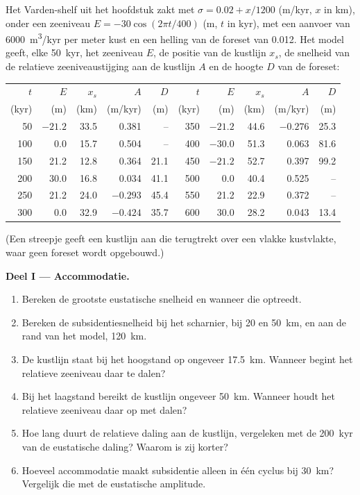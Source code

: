 \begin{problem}
\label{pb:b3:sequence-stratigraphy:1}
Het Varden-shelf uit het hoofdstuk zakt met $\sigma = 0.02 + x/1200$
(\unit{m/kyr}, $x$ in km), onder een zeeniveau $E = -30\cos(2\pi t/400)$ (m,
$t$ in kyr), met een aanvoer van \qty{6000}{m^3/kyr} per meter kust en een
helling van de foreset van 0.012. Het model geeft, elke \qty{50}{kyr}, het zeeniveau
$E$, de positie van de kustlijn $x_s$, de snelheid van de relatieve zeeniveaustijging aan de
kustlijn $A$ en de hoogte $D$ van de foreset:

\begin{center}\small
\begin{tabular}{rrrrr|rrrrr}
$t$ & $E$ & $x_s$ & $A$ & $D$ & $t$ & $E$ & $x_s$ & $A$ & $D$\\
(kyr) & (m) & (km) & (m/kyr) & (m) & (kyr) & (m) & (km) & (m/kyr) & (m)\\\hline
50 & $-21.2$ & 33.5 & 0.381 & -- & 350 & $-21.2$ & 44.6 & $-0.276$ & 25.3\\
100 & 0.0 & 15.7 & 0.504 & -- & 400 & $-30.0$ & 51.3 & 0.063 & 81.6\\
150 & 21.2 & 12.8 & 0.364 & 21.1 & 450 & $-21.2$ & 52.7 & 0.397 & 99.2\\
200 & 30.0 & 16.8 & 0.034 & 41.1 & 500 & 0.0 & 40.4 & 0.525 & --\\
250 & 21.2 & 24.0 & $-0.293$ & 45.4 & 550 & 21.2 & 22.9 & 0.372 & --\\
300 & 0.0 & 32.9 & $-0.424$ & 35.7 & 600 & 30.0 & 28.2 & 0.043 & 13.4\\
\end{tabular}
\end{center}
(Een streepje geeft een kustlijn aan die terugtrekt over een vlakke kustvlakte, waar
geen foreset wordt opgebouwd.)

\medskip\noindent\textbf{Deel I --- Accommodatie.}
\begin{enumerate}
\item Bereken de grootste eustatische snelheid en wanneer die optreedt.
\item Bereken de subsidentiesnelheid bij het scharnier, bij 20 en \qty{50}{km}, en
  aan de rand van het model, \qty{120}{km}.
\item De kustlijn staat bij het hoogstand op ongeveer \qty{17.5}{km}. Wanneer begint
  het relatieve zeeniveau daar te dalen?
\item Bij het laagstand bereikt de kustlijn ongeveer \qty{50}{km}. Wanneer houdt
  het relatieve zeeniveau daar op met dalen?
\item Hoe lang duurt de relatieve daling aan de kustlijn, vergeleken met de
  \qty{200}{kyr} van de eustatische daling? Waarom is zij korter?
\item Hoeveel accommodatie maakt subsidentie alleen in één cyclus bij
  \qty{30}{km}? Vergelijk die met de eustatische amplitude.
\end{enumerate}


\end{problem}
